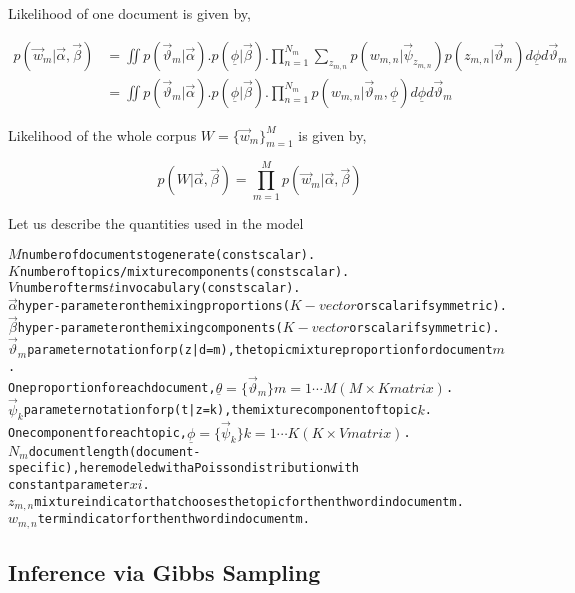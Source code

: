 Likelihood of one document is given by,

\begin{align}
p(\vec{w}_m|\vec{\alpha},\vec{\beta})		& = \iint p(\vec{\vartheta}_m|\vec{\alpha}).p(\underline{\phi}|\vec{\beta}).\prod_{n=1}^{N_m} \sum_{z_{m,n}} p(w_{m,n}|\vec{\psi}_{z_{m,n}})p(z_{m,n}|\vec{\vartheta}_m)d\underline{\phi}d\vec{\vartheta}_m \\                                  
						& = \iint p(\vec{\vartheta}_m|\vec{\alpha}).p(\underline{\phi}|\vec{\beta}).\prod_{n=1}^{N_m} p(w_{m,n}|\vec{\vartheta}_m,\underline{\phi}) d\underline{\phi}d\vec{\vartheta}_m
\end{align}

Likelihood of the whole corpus \(W = \{\vec{w}_m\}_{m=1}^{M}\) is given by,

\begin{equation}
p(W|\vec{\alpha},\vec{\beta}) = \prod_{m=1}^{M} p(\vec{w}_m|\vec{\alpha},\vec{\beta})
\end{equation}

Let us describe the quantities used in the model

\begin{alltt}
\(M\) number of documents to generate (const scalar).
\(K\) number of topics/mixture components (const scalar).
\(V\) number of terms \(t\) in vocabulary (const scalar).
\(\vec{\alpha}\) hyper-parameter on the mixing proportions (\(K-vector\) or scalar if symmetric).
\(\vec{\beta}\) hyper-parameter on the mixing components (\(K-vector\) or scalar if symmetric).
\(\vec{\vartheta}_m\) parameter notation for p(z|d=m), the topic mixture proportion for document \(m\). 
  One proportion for each document, \(\underline{\theta} = \{\vec{\vartheta}_m\} m=1 \cdots M (M \times K matrix)\).
\(\vec{\psi}_k\) parameter notation for p(t|z=k), the mixture component of topic \(k\). 
  One component for each topic, \(\underline{\phi} = \{\vec{\psi}_k\} k=1 \cdots K (K \times V matrix)\).
\(N_m\) document length (document-specific), here modeled with a Poisson distribution with 
  constant parameter \(xi\).
\(z_{m,n}\) mixture indicator that chooses the topic for the nth word in document m.
\(w_{m,n}\) term indicator for the nth word in document m.
\end{alltt}

\subsection{Inference via Gibbs Sampling}

